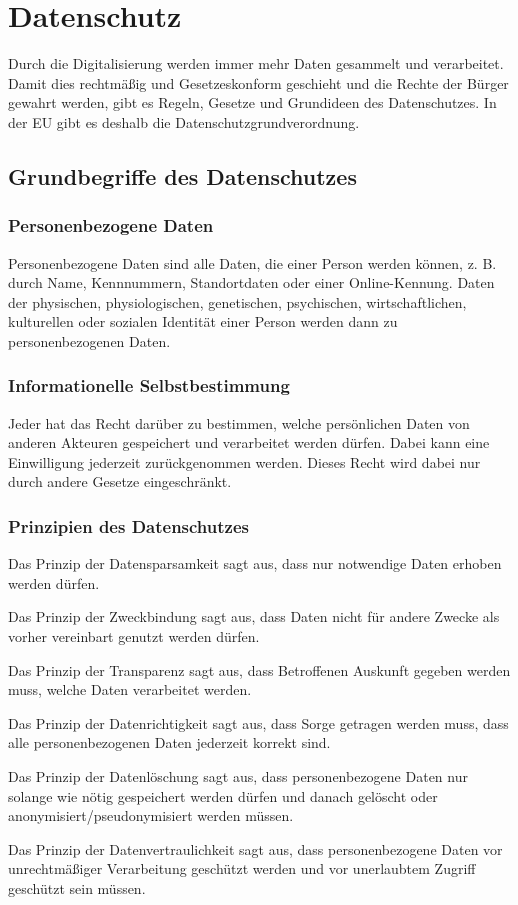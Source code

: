 \section{Datenschutz}

Durch die Digitalisierung werden immer mehr Daten gesammelt und verarbeitet.
Damit dies rechtmäßig und Gesetzeskonform geschieht und die Rechte der Bürger
gewahrt werden, gibt es Regeln, Gesetze und Grundideen des Datenschutzes.
In der EU gibt es deshalb die Datenschutzgrundverordnung.

\subsection{Grundbegriffe des Datenschutzes}

\subsubsection{Personenbezogene Daten}

Personenbezogene Daten sind alle Daten, die einer Person werden können,
z. B. durch Name, Kennnummern, Standortdaten oder einer Online-Kennung.
Daten der physischen, physiologischen, genetischen, psychischen, wirtschaftlichen,
kulturellen oder sozialen Identität einer Person werden dann zu personenbezogenen Daten.

\subsubsection{Informationelle Selbstbestimmung}

Jeder hat das Recht darüber zu bestimmen, welche persönlichen Daten von anderen Akteuren
gespeichert und verarbeitet werden dürfen. Dabei kann eine Einwilligung jederzeit
zurückgenommen werden. Dieses Recht wird dabei nur durch andere Gesetze eingeschränkt.

\subsubsection{Prinzipien des Datenschutzes}

Das Prinzip der Datensparsamkeit sagt aus, dass nur notwendige Daten erhoben werden dürfen.

Das Prinzip der Zweckbindung sagt aus, dass Daten nicht für andere Zwecke als vorher
vereinbart genutzt werden dürfen.

Das Prinzip der Transparenz sagt aus, dass Betroffenen Auskunft gegeben werden muss,
welche Daten verarbeitet werden.

Das Prinzip der Datenrichtigkeit sagt aus, dass Sorge getragen werden muss,
dass alle personenbezogenen Daten jederzeit korrekt sind.

Das Prinzip der Datenlöschung sagt aus, dass personenbezogene Daten nur solange
wie nötig gespeichert werden dürfen und danach gelöscht oder anonymisiert/pseudonymisiert
werden müssen.

Das Prinzip der Datenvertraulichkeit sagt aus, dass personenbezogene Daten
vor unrechtmäßiger Verarbeitung geschützt werden und vor unerlaubtem
Zugriff geschützt sein müssen.
